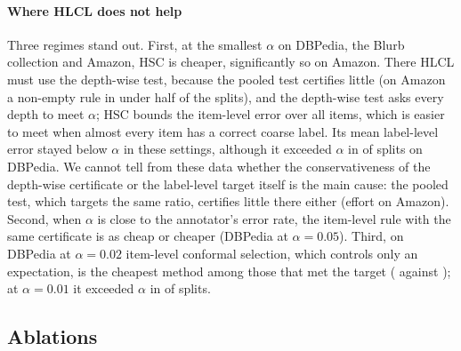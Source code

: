 \documentclass[preprint,12pt]{elsarticle}
\theoremstyle{definition}
\theoremstyle{remark}
\newcommand{\hlcl}{\textup{\textsc{HLCL}}}
\begin{document}
\paragraph{Where \hlcl{} does not help}
Three regimes stand out. First, at the smallest $\alpha$ on DBPedia, the
Blurb collection and Amazon, HSC is cheaper, significantly so on Amazon. There \hlcl{} must use the depth-wise test,
because the pooled test certifies little (on Amazon a non-empty rule in under
half of the splits), and the depth-wise test asks every
depth to meet $\alpha$; HSC bounds the item-level error over all items, which is
easier to meet when almost every item has a correct coarse label. Its mean
label-level error stayed below $\alpha$ in these settings, although it exceeded
$\alpha$ in  of splits on DBPedia. We cannot tell
from these data whether the conservativeness of the depth-wise certificate or the
label-level target itself is the main cause: the pooled test, which targets the
same ratio, certifies little there either (effort
 on Amazon). Second, when $\alpha$ is close to the annotator's
error rate, the item-level rule with the same certificate is as cheap or cheaper
(DBPedia at $\alpha=0.05$). Third, on DBPedia at $\alpha=0.02$ item-level
conformal selection, which controls only an expectation, is the cheapest method
among those that met the target ( against
); at $\alpha=0.01$ it exceeded $\alpha$ in
 of splits.

\subsection{Ablations}
\label{sec:exp-abl}

\begin{table}[t]
\centering
\scriptsize
\setlength{\tabcolsep}{2pt}
\caption{Effort of \hlcl{} variants (100 splits; lower is better; bold: within
$0.005$ of the best in the row and test group). Each variant is run with the
automatic choice of test (left), with the pooled betting test only (middle) and
with the depth-wise test only (right), so that the effect of a component is not
confounded with the test that happens to be selected. \emph{vote}: raw sample
agreement instead of the learned score; \emph{no cl.}: no ancestor closure,
nodes accepted independently; \emph{tied}: one threshold for all depths.}
\label{tab:abl}

\end{table}
\end{document}
